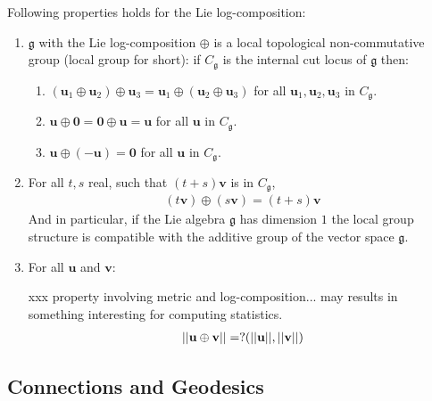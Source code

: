 \noindent
Following properties holds for the Lie log-composition:
\begin{enumerate}
	\item $\mathfrak{g} $ with the Lie log-composition $\oplus$ is a local topological non-commutative group (local group for short): if $C_{\mathfrak{g}}$ is the internal cut locus of $\mathfrak{g}$ then:
	\begin{enumerate}
		\item $(\mathbf{u}_{1}\oplus\mathbf{u}_{2}) \oplus \mathbf{u}_{3}
		= \mathbf{u}_{1}\oplus(\mathbf{u}_{2} \oplus \mathbf{u}_{3})$ for all $\mathbf{u}_{1}, \mathbf{u}_{2}, \mathbf{u}_{3}$ in $C_{\mathfrak{g}}$.
		\item $\mathbf{u}\oplus\mathbf{0}  = \mathbf{0}\oplus\mathbf{u} = \mathbf{u}$ for all $\mathbf{u}$ in $C_{\mathfrak{g}}$.
		\item $\mathbf{u}\oplus(-\mathbf{u} ) = \mathbf{0}$ for all $\mathbf{u}$ in $C_{\mathfrak{g}}$.
	\end{enumerate}
	\item For all $t,s$ real, such that $(t+s)\mathbf{v}$ is in $C_{\mathfrak{g}}$,
	\begin{align*}
	(t\mathbf{v})\oplus (s\mathbf{v}) = (t+s)\mathbf{v}
	\end{align*}
	And in particular, if the Lie algebra $\mathfrak{g}$ has dimension $1$ the local group structure is compatible with the additive group of the vector space $\mathfrak{g}$.
	\item For all $\mathbf{u}$ and $\mathbf{v}$: 
	
	\noindent
	xxx property involving metric and log-composition... may results in something interesting for computing statistics.
	\begin{align*}
	\vert\lvert \mathbf{u}\oplus \mathbf{v} \rvert\vert = ?( \vert\lvert \mathbf{u} \rvert\vert , \vert\lvert \mathbf{v} \rvert\vert)
	\end{align*}
\end{enumerate}






\subsection{Connections and Geodesics}


